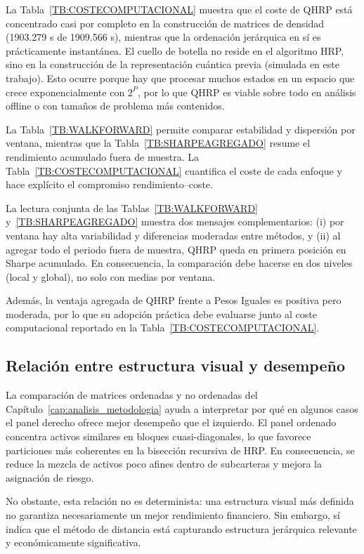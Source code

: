La Tabla~\ref{TB:COSTECOMPUTACIONAL} muestra que el coste de QHRP está concentrado casi por completo en la construcción de matrices de densidad (1903.279 s de 1909.566 s), mientras que la ordenación jerárquica en sí es prácticamente instantánea. El cuello de botella no reside en el algoritmo HRP, sino en la construcción de la representación cuántica previa (simulada en este trabajo). Esto ocurre porque hay que procesar muchos estados en un espacio que crece exponencialmente con $2^P$, por lo que QHRP es viable sobre todo en análisis offline o con tamaños de problema más contenidos.

La Tabla~\ref{TB:WALKFORWARD} permite comparar estabilidad y dispersión por ventana, mientras que la Tabla~\ref{TB:SHARPEAGREGADO} resume el rendimiento acumulado fuera de muestra. La Tabla~\ref{TB:COSTECOMPUTACIONAL} cuantifica el coste de cada enfoque y hace explícito el compromiso rendimiento--coste.

La lectura conjunta de las Tablas~\ref{TB:WALKFORWARD} y~\ref{TB:SHARPEAGREGADO} muestra dos mensajes complementarios: (i) por ventana hay alta variabilidad y diferencias moderadas entre métodos, y (ii) al agregar todo el periodo fuera de muestra, QHRP queda en primera posición en Sharpe acumulado. En consecuencia, la comparación debe hacerse en dos niveles (local y global), no solo con medias por ventana.

Además, la ventaja agregada de QHRP frente a Pesos Iguales es positiva pero moderada, por lo que su adopción práctica debe evaluarse junto al coste computacional reportado en la Tabla~\ref{TB:COSTECOMPUTACIONAL}.

\subsection{Relación entre estructura visual y desempeño}
La comparación de matrices ordenadas y no ordenadas del Capítulo~\ref{cap:analisis_metodologia} ayuda a interpretar por qué en algunos casos el panel derecho ofrece mejor desempeño que el izquierdo. El panel ordenado concentra activos similares en bloques cuasi-diagonales, lo que favorece particiones más coherentes en la bisección recursiva de HRP. En consecuencia, se reduce la mezcla de activos poco afines dentro de subcarteras y mejora la asignación de riesgo.

No obstante, esta relación no es determinista: una estructura visual más definida no garantiza necesariamente un mejor rendimiento financiero. Sin embargo, sí indica que el método de distancia está capturando estructura jerárquica relevante y económicamente significativa.

